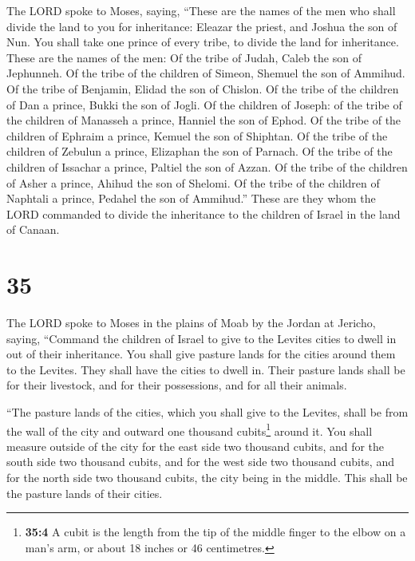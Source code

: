  The LORD spoke to Moses, saying,  ``These
are the names of the men who shall divide the land to you for
inheritance: Eleazar the priest, and Joshua the son of Nun.
 You shall take one prince of every tribe, to divide the
land for inheritance.  These are the names of the men: Of
the tribe of Judah, Caleb the son of Jephunneh.  Of the
tribe of the children of Simeon, Shemuel the son of Ammihud.
 Of the tribe of Benjamin, Elidad the son of Chislon.
 Of the tribe of the children of Dan a prince, Bukki the
son of Jogli.  Of the children of Joseph: of the tribe of
the children of Manasseh a prince, Hanniel the son of Ephod.
 Of the tribe of the children of Ephraim a prince, Kemuel
the son of Shiphtan.  Of the tribe of the children of
Zebulun a prince, Elizaphan the son of Parnach.  Of the
tribe of the children of Issachar a prince, Paltiel the son of Azzan.
 Of the tribe of the children of Asher a prince, Ahihud
the son of Shelomi.  Of the tribe of the children of
Naphtali a prince, Pedahel the son of Ammihud.''  These
are they whom the LORD commanded to divide the inheritance to the
children of Israel in the land of Canaan.

\hypertarget{section-34}{%
\section{35}\label{section-34}}

 The LORD spoke to Moses in the plains of Moab by the
Jordan at Jericho, saying,  ``Command the children of
Israel to give to the Levites cities to dwell in out of their
inheritance. You shall give pasture lands for the cities around them to
the Levites.  They shall have the cities to dwell in.
Their pasture lands shall be for their livestock, and for their
possessions, and for all their animals.

 ``The pasture lands of the cities, which you shall give
to the Levites, shall be from the wall of the city and outward one
thousand cubits\footnote{\textbf{35:4} A cubit is the length from the
  tip of the middle finger to the elbow on a man's arm, or about 18
  inches or 46 centimetres.} around it.  You shall measure
outside of the city for the east side two thousand cubits, and for the
south side two thousand cubits, and for the west side two thousand
cubits, and for the north side two thousand cubits, the city being in
the middle. This shall be the pasture lands of their cities.

